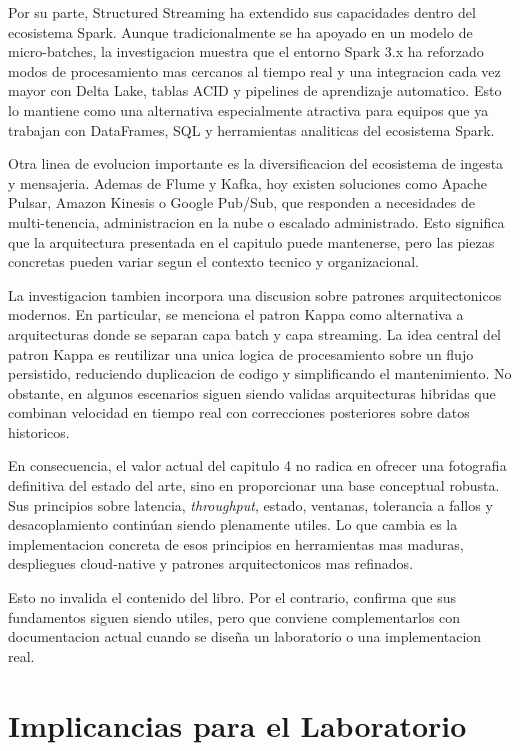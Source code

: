 \documentclass[12pt,a4paper]{article}
\begin{document}
Por su parte, Structured Streaming ha extendido sus capacidades dentro del ecosistema Spark. Aunque tradicionalmente se ha apoyado en un modelo de micro-batches, la investigacion muestra que el entorno Spark 3.x ha reforzado modos de procesamiento mas cercanos al tiempo real y una integracion cada vez mayor con Delta Lake, tablas ACID y pipelines de aprendizaje automatico. Esto lo mantiene como una alternativa especialmente atractiva para equipos que ya trabajan con DataFrames, SQL y herramientas analiticas del ecosistema Spark.

Otra linea de evolucion importante es la diversificacion del ecosistema de ingesta y mensajeria. Ademas de Flume y Kafka, hoy existen soluciones como Apache Pulsar, Amazon Kinesis o Google Pub/Sub, que responden a necesidades de multi-tenencia, administracion en la nube o escalado administrado. Esto significa que la arquitectura presentada en el capitulo puede mantenerse, pero las piezas concretas pueden variar segun el contexto tecnico y organizacional.

La investigacion tambien incorpora una discusion sobre patrones arquitectonicos modernos. En particular, se menciona el patron Kappa como alternativa a arquitecturas donde se separan capa batch y capa streaming. La idea central del patron Kappa es reutilizar una unica logica de procesamiento sobre un flujo persistido, reduciendo duplicacion de codigo y simplificando el mantenimiento. No obstante, en algunos escenarios siguen siendo validas arquitecturas hibridas que combinan velocidad en tiempo real con correcciones posteriores sobre datos historicos.

En consecuencia, el valor actual del capitulo 4 no radica en ofrecer una fotografia definitiva del estado del arte, sino en proporcionar una base conceptual robusta. Sus principios sobre latencia, \textit{throughput}, estado, ventanas, tolerancia a fallos y desacoplamiento continúan siendo plenamente utiles. Lo que cambia es la implementacion concreta de esos principios en herramientas mas maduras, despliegues cloud-native y patrones arquitectonicos mas refinados.

Esto no invalida el contenido del libro. Por el contrario, confirma que sus fundamentos siguen siendo utiles, pero que conviene complementarlos con documentacion actual cuando se diseña un laboratorio o una implementacion real.

\section{Implicancias para el Laboratorio}
\end{document}
